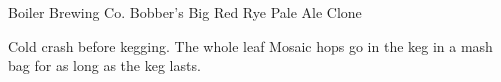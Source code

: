 \begin{recipe}{Boiler Brewing Co. Bobber's Big Red Rye Pale Ale Clone}

\begin{aboutblock}
\sourceaha
\end{aboutblock}


\begin{methodandtiming}
 
\begin{mashsteps}
\end{mashsteps}

\begin{fermentationsteps}
\end{fermentationsteps}

\begin{directions}
Cold crash before kegging. The whole leaf Mosaic hops go in the keg in a mash bag
for as long as the keg lasts.
\end{directions}

\end{methodandtiming}

\recipebreak

\begin{ingredientsblock}

\begin{malts}
\end{malts}

\begin{hops}
\end{hops}


\end{ingredientsblock}

\end{recipe}

